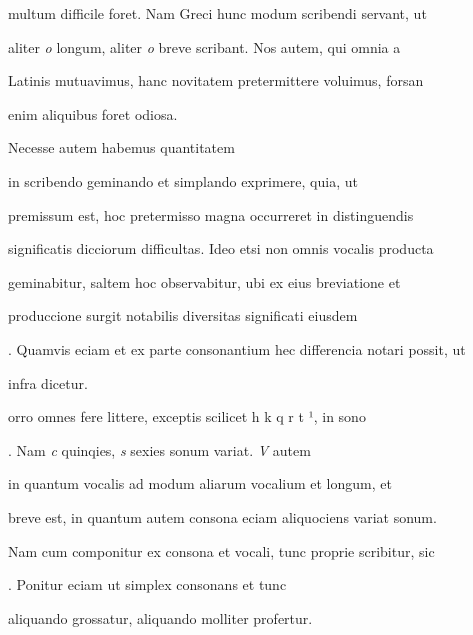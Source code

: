 multum difficile foret. Nam Greci hunc modum scribendi servant, ut

aliter \textit{o} longum, aliter \textit{o} breve scribant. Nos autem, qui omnia a

Latinis mutuavimus, hanc novitatem pretermittere voluimus, forsan

\splitlines{}

enim aliquibus foret odiosa.

\indentK Necesse autem habemus quantitatem 

\fulllines{}

 in scribendo geminando et simplando exprimere, quia, ut

premissum est, hoc pretermisso magna occurreret in distinguendis

significatis dicciorum difficultas. Ideo etsi non omnis vocalis producta

geminabitur, saltem hoc observabitur, ubi ex eius breviatione et

produccione surgit notabilis diversitas significati eiusdem 

. Quamvis eciam et ex parte consonantium hec differencia notari possit, ut

\splitlines{}



infra dicetur.

\indentK {}orro omnes fere littere, exceptis scilicet  h  k q r t ¹, in sono 

. Nam \textit{c} quinqies, \textit{s} sexies sonum variat. \textit{V} autem

in quantum vocalis ad modum aliarum vocalium et longum, et

breve est, in quantum autem consona eciam aliquociens variat sonum.

Nam cum componitur ex consona et vocali, tunc proprie scribitur, sic

 . Ponitur eciam ut simplex consonans et tunc


\fullpreviouslines


{
\color{blue}


aliquando grossatur, aliquando molliter profertur.

}

